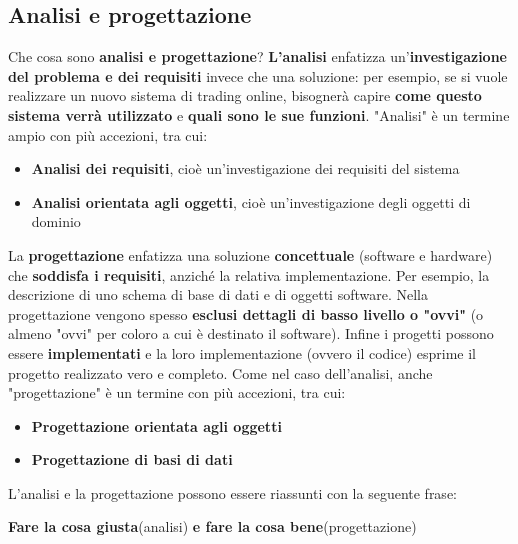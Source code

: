 \documentclass[12pt]{article}
\begin{document}
\subsection{Analisi e progettazione}
Che cosa sono \textbf{analisi e progettazione}? \newline
\textbf{L'analisi} enfatizza un'\textbf{investigazione del problema e dei requisiti} invece che una soluzione: per esempio, se si vuole realizzare un nuovo sistema di trading online,
bisognerà capire \textbf{come questo sistema verrà utilizzato} e \textbf{quali sono le sue funzioni}. "Analisi" è un termine ampio con più accezioni, tra cui:
\begin{itemize}
    \item \textbf{Analisi dei requisiti}, cioè un'investigazione dei requisiti del sistema
    \item \textbf{Analisi orientata agli oggetti}, cioè un'investigazione degli oggetti di dominio
\end{itemize} 
La \textbf{progettazione} enfatizza una soluzione \textbf{concettuale} (software e hardware) che \textbf{soddisfa i requisiti}, anziché la relativa implementazione. Per esempio, la descrizione di uno schema di base di dati
e di oggetti software. Nella progettazione vengono spesso \textbf{esclusi dettagli di basso livello o "ovvi"} (o almeno "ovvi" per coloro a cui è destinato il software). \newline
Infine i progetti possono essere \textbf{implementati} e la loro implementazione (ovvero il codice) esprime il progetto realizzato vero e completo.
Come nel caso dell'analisi, anche "progettazione" è un termine con più accezioni, tra cui:
\begin{itemize}
    \item \textbf{Progettazione orientata agli oggetti}
    \item \textbf{Progettazione di basi di dati}
\end{itemize}
L'analisi e la progettazione possono essere riassunti con la seguente frase:
\begin{center}
    \textbf{Fare la cosa giusta}(analisi) \textbf{e fare la cosa bene}(progettazione)
\end{center}
\end{document}
